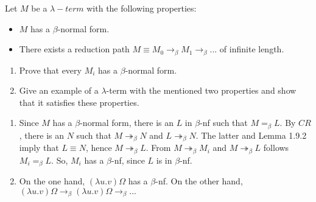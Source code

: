 \begin{problem}{1.16}
    Let $M$ be a $\lambda-term$ with the following properties:
    \begin{itemize}
        \item $M$ has a $\beta$-normal form.
        \item There exists a reduction path $M \equiv M_0 \to_\beta M_1 \to_\beta ...$ of infinite length.
    \end{itemize}
    \begin{enumerate}[label=$(\alph*)$]
        \item Prove that every $M_i$ has a $\beta$-normal form.
        \item Give an example of a $\lambda$-term with the mentioned two properties and show that it satisfies these properties.
    \end{enumerate}
\end{problem}

\begin{solution}
    \begin{enumerate}[label=$(\alph*)$]
        \item Since $M$ has a $\beta$-normal form, there is an $L$ in $\beta$-nf such that $M =_\beta L$. By $CR$, there is an $N$
                such that $M \twoheadrightarrow_\beta N$ and $L \twoheadrightarrow_\beta N$. The latter and Lemma 1.9.2 imply that $L \equiv N$, hence $M \twoheadrightarrow_\beta L$.
                From $M \twoheadrightarrow_\beta M_i$ and $M \twoheadrightarrow_\beta L$ follows $M_i =_\beta L$. So, $M_i$ has a $\beta$-nf, since $L$ is in $\beta$-nf.
        \item On the one hand, $(\lambda u.v)\Omega$ has a $\beta$-nf. On the other hand, $(\lambda u.v)\Omega \to_\beta (\lambda u.v)\Omega \to_\beta ...$
    \end{enumerate}
\end{solution}